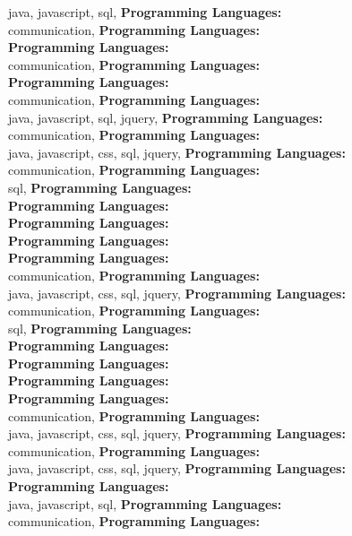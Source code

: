 java, javascript, sql, \textbf{Programming Languages:} \\
communication, \textbf{Programming Languages:} \\
\textbf{Programming Languages:} \\
communication, \textbf{Programming Languages:} \\
\textbf{Programming Languages:} \\
communication, \textbf{Programming Languages:} \\
java, javascript, sql, jquery, \textbf{Programming Languages:} \\
communication, \textbf{Programming Languages:} \\
java, javascript, css, sql, jquery, \textbf{Programming Languages:} \\
communication, \textbf{Programming Languages:} \\
sql, \textbf{Programming Languages:} \\
\textbf{Programming Languages:} \\
\textbf{Programming Languages:} \\
\textbf{Programming Languages:} \\
\textbf{Programming Languages:} \\
communication, \textbf{Programming Languages:} \\
java, javascript, css, sql, jquery, \textbf{Programming Languages:} \\
communication, \textbf{Programming Languages:} \\
sql, \textbf{Programming Languages:} \\
\textbf{Programming Languages:} \\
\textbf{Programming Languages:} \\
\textbf{Programming Languages:} \\
\textbf{Programming Languages:} \\
communication, \textbf{Programming Languages:} \\
java, javascript, css, sql, jquery, \textbf{Programming Languages:} \\
communication, \textbf{Programming Languages:} \\
java, javascript, css, sql, jquery, \textbf{Programming Languages:} \\
\textbf{Programming Languages:} \\
java, javascript, sql, \textbf{Programming Languages:} \\
communication, \textbf{Programming Languages:} \\
